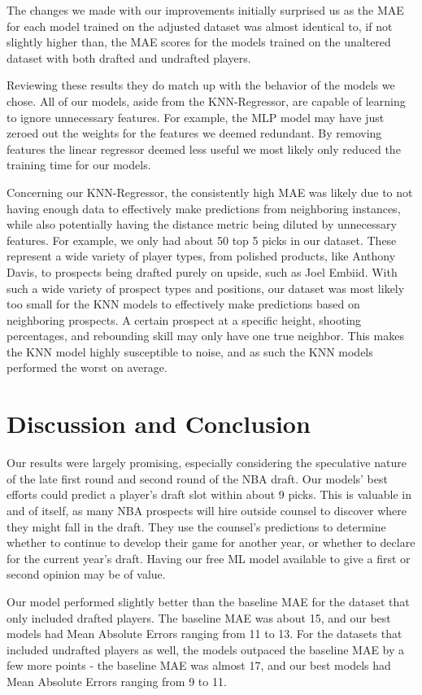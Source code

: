 \documentclass{article}
\begin{document}
The changes we made with our improvements initially surprised us as the MAE for
each model trained on the adjusted dataset was almost identical to, if not
slightly higher than, the MAE scores for the models trained on the unaltered
dataset with both drafted and undrafted players. 

Reviewing these results they do match up with the behavior of the models we
chose. All of our models, aside from the KNN-Regressor, are capable of learning
to ignore unnecessary features. For example, the MLP model may have just zeroed
out the weights for the features we deemed redundant. By removing features the
linear regressor deemed less useful we most likely only reduced the training
time for our models.

Concerning our KNN-Regressor, the consistently high MAE was likely due to not
having enough data to effectively make predictions from neighboring instances,
while also potentially having the distance metric being diluted by unnecessary
features. For example, we only had about 50 top 5 picks in our dataset. These
represent a wide variety of player types, from polished products, like Anthony
Davis, to prospects being drafted purely on upside, such as Joel Embiid. With
such a wide variety of prospect types and positions, our dataset was most likely
too small for the KNN models to effectively make predictions based on
neighboring prospects. A certain prospect at a specific height, shooting
percentages, and rebounding skill may only have one true neighbor. This makes
the KNN model highly susceptible to noise, and as such the KNN models performed
the worst on average.

\section{Discussion and Conclusion}

Our results were largely promising, especially considering the speculative
nature of the late first round and second round of the NBA draft. Our models'
best efforts could predict a player's draft slot within about 9 picks. This is
valuable in and of itself, as many NBA prospects will hire outside counsel to
discover where they might fall in the draft. They use the counsel's predictions
to determine whether to continue to develop their game for another year, or
whether to declare for the current year's draft. Having our free ML model
available to give a first or second opinion may be of value.

Our model performed slightly better than the baseline MAE for the dataset that
only included drafted players. The baseline MAE was about 15, and our best
models had Mean Absolute Errors ranging from 11 to 13. For the datasets that
included undrafted players as well, the models outpaced the baseline MAE by a
few more points - the baseline MAE was almost 17, and our best models had Mean
Absolute Errors ranging from 9 to 11.
\end{document}
